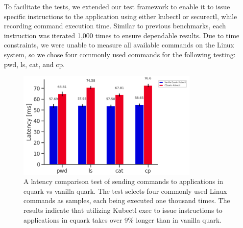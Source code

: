 To facilitate the tests, we extended our test framework to enable it to issue specific instructions to the application using either kubectl or securectl, while recording command execution time\cite*{benchamark_perf_kubectl}. Similar to previous benchmarks, each instruction was iterated 1,000 times 
to ensure dependable results. Due to time constraints, we were unable to measure all available commands on the Linux system, so we chose four commonly used commands for the following testing: pwd, ls, cat, and cp.


\begin{figure}[H]
    \centering
    \includegraphics[width=0.8\textwidth]{images/speed_of_issuing_cmd_in_cquark_upstream_quark.PNG}
    \caption[Benchmark result - Latency Comparison of sending Commands to Application in Cquark vs vanilla Quark]{A latency comparison test of sending commands to applications in cquark vs vanilla quark.  The test selects four 
    commonly used Linux commands as samples, each being executed one thousand times. The results indicate that utilizing Kubectl exec to issue instructions to applications in cquark takes over 9\% longer than in vanilla quark.
    }
    \label{fig:speed_of_issuing_cmd_in_cquark_upstream_quark}
\end{figure}




